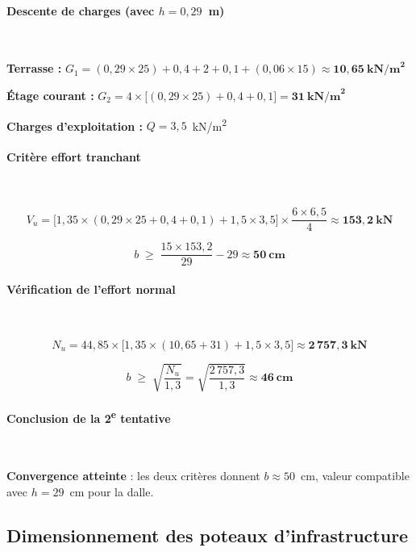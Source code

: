 \paragraph{Descente de charges (avec $h = 0{,}29$~m)}~

\textbf{Terrasse :} $G_1 = (0{,}29 \times 25) + 0{,}4 + 2 + 0{,}1 + (0{,}06 \times 15) \approx \mathbf{10{,}65~\text{kN/m}^2}$

\textbf{Étage courant :} $G_2 = 4 \times \big[(0{,}29 \times 25) + 0{,}4 + 0{,}1\big] = \mathbf{31~\text{kN/m}^2}$

\textbf{Charges d'exploitation :} $Q = 3{,}5$~kN/m\textsuperscript{2}

\paragraph{Critère effort tranchant}~

\[
V_u = \big[1{,}35 \times (0{,}29 \times 25 + 0{,}4 + 0{,}1) + 1{,}5 \times 3{,}5\big] \times \frac{6 \times 6{,}5}{4} \approx \mathbf{153{,}2~\text{kN}}
\]

\[
b \;\geq\; \frac{15 \times 153{,}2}{29} - 29 \approx \mathbf{50~\text{cm}}
\]

\paragraph{Vérification de l'effort normal}~

\[
N_u = 44{,}85 \times \big[1{,}35 \times (10{,}65 + 31) + 1{,}5 \times 3{,}5\big] \approx \mathbf{2\,757{,}3~\text{kN}}
\]

\[
b \;\geq\; \sqrt{\frac{N_u}{1{,}3}} = \sqrt{\frac{2\,757{,}3}{1{,}3}} \approx \mathbf{46~\text{cm}}
\]

\paragraph{Conclusion de la 2\textsuperscript{e} tentative}~

\textbf{Convergence atteinte} : les deux critères donnent $b \approx 50$~cm, valeur compatible avec $h = 29$~cm pour la dalle.


\subsection{Dimensionnement des poteaux d'infrastructure}

